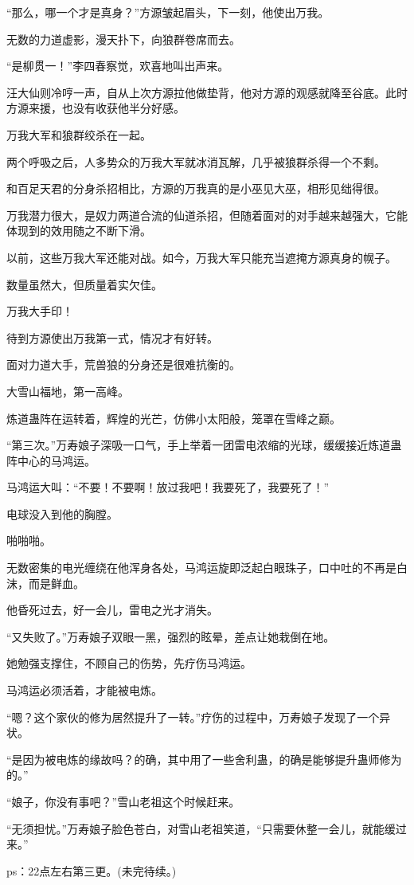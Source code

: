 \begin{this_body}
“那么，哪一个才是真身？”方源皱起眉头，下一刻，他使出万我。

无数的力道虚影，漫天扑下，向狼群卷席而去。

“是柳贯一！”李四春察觉，欢喜地叫出声来。

汪大仙则冷哼一声，自从上次方源拉他做垫背，他对方源的观感就降至谷底。此时方源来援，也没有收获他半分好感。

万我大军和狼群绞杀在一起。

两个呼吸之后，人多势众的万我大军就冰消瓦解，几乎被狼群杀得一个不剩。

和百足天君的分身杀招相比，方源的万我真的是小巫见大巫，相形见绌得很。

万我潜力很大，是奴力两道合流的仙道杀招，但随着面对的对手越来越强大，它能体现到的效用随之不断下滑。

以前，这些万我大军还能对战。如今，万我大军只能充当遮掩方源真身的幌子。

数量虽然大，但质量着实欠佳。

万我大手印！

待到方源使出万我第一式，情况才有好转。

面对力道大手，荒兽狼的分身还是很难抗衡的。

大雪山福地，第一高峰。

炼道蛊阵在运转着，辉煌的光芒，仿佛小太阳般，笼罩在雪峰之巅。

“第三次。”万寿娘子深吸一口气，手上举着一团雷电浓缩的光球，缓缓接近炼道蛊阵中心的马鸿运。

马鸿运大叫：“不要！不要啊！放过我吧！我要死了，我要死了！”

电球没入到他的胸膛。

啪啪啪。

无数密集的电光缠绕在他浑身各处，马鸿运旋即泛起白眼珠子，口中吐的不再是白沫，而是鲜血。

他昏死过去，好一会儿，雷电之光才消失。

“又失败了。”万寿娘子双眼一黑，强烈的眩晕，差点让她栽倒在地。

她勉强支撑住，不顾自己的伤势，先疗伤马鸿运。

马鸿运必须活着，才能被电炼。

“嗯？这个家伙的修为居然提升了一转。”疗伤的过程中，万寿娘子发现了一个异状。

“是因为被电炼的缘故吗？的确，其中用了一些舍利蛊，的确是能够提升蛊师修为的。”

“娘子，你没有事吧？”雪山老祖这个时候赶来。

“无须担忧。”万寿娘子脸色苍白，对雪山老祖笑道，“只需要休整一会儿，就能缓过来。”

ps：22点左右第三更。(未完待续。)

\end{this_body}

